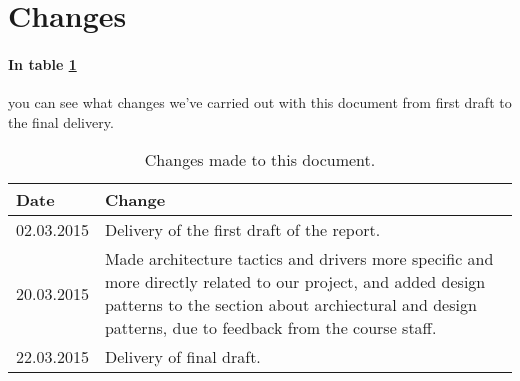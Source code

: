 \section{Changes}

\paragraph{In table \ref{tab:changes}} you can see what changes we've  carried out with this document from first draft to the final delivery.

\begin{table}[h]
\label{tab:changes}
\begin{center}
\begin{tabular}{|p{2cm}|p{13cm}|}
\hline
 \textbf{Date}& \textbf{Change} \\ \hline \hline
 02.03.2015 & Delivery of the first draft of the report.\\ \hline
20.03.2015 & Made architecture tactics and drivers more specific and more directly related to our project, and added design patterns to the section about archiectural and design patterns, due to feedback from the course staff. \\ \hline 
22.03.2015 & Delivery of final draft.\\ \hline
 
 \hline
 \end{tabular}
\caption{Changes made to this document.}
\end{center}
\end{table}
